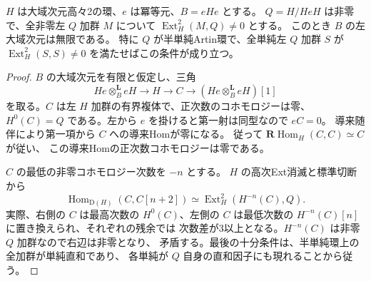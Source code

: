 \begin{lemma}\label{lem:cubic-CY-three-alpha-defective-idempotent}
$H$ は大域次元高々2の環、$e$ は冪等元、$B=eHe$ とする。
$Q=H/HeH$ は非零で、全非零左 $Q$ 加群 $M$ について
$\operatorname{Ext}^2_H(M,Q)\ne0$ とする。
このとき $B$ の左大域次元は無限である。
特に $Q$ が半単純Artin環で、全単純左 $Q$ 加群 $S$ が
$\operatorname{Ext}^2_H(S,S)\ne0$ を満たせばこの条件が成り立つ。
\end{lemma}
\begin{proof}
$B$ の大域次元を有限と仮定し、三角
\[
 He\otimes^{\mathbf L}_B eH \longrightarrow H\longrightarrow C
 \longrightarrow (He\otimes^{\mathbf L}_B eH)[1]
\]
を取る。$C$ は左 $H$ 加群の有界複体で、正次数のコホモロジーは零、
$H^0(C)=Q$ である。左から $e$ を掛けると第一射は同型なので $eC=0$。
導来随伴により第一項から $C$ への導来Homが零になる。
従って $\mathbf R\operatorname{Hom}_H(C,C)\simeq C$ が従い、
この導来Homの正次数コホモロジーは零である。

$C$ の最低の非零コホモロジー次数を $-n$ とする。
$H$ の高次Ext消滅と標準切断から
\[
 \operatorname{Hom}_{\mathrm D(H)}(C,C[n+2])
  \simeq \operatorname{Ext}^2_H(H^{-n}(C),Q).
\]
実際、右側の $C$ は最高次数の $H^0(C)$、左側の $C$ は最低次数の
$H^{-n}(C)[n]$ に置き換えられ、それぞれの残余では
次数差が3以上となる。$H^{-n}(C)$ は非零 $Q$ 加群なので右辺は非零となり、
矛盾する。最後の十分条件は、半単純環上の全加群が単純直和であり、
各単純が $Q$ 自身の直和因子にも現れることから従う。
\end{proof}

